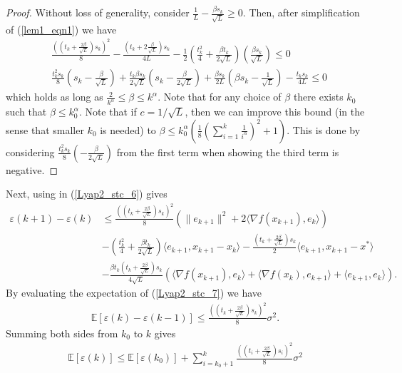 \documentclass{article}
\theoremstyle{plain}
\theoremstyle{definition}
\theoremstyle{remark}
\begin{document}
        \begin{proof}\label{lem1_proof}
            Without loss of generality, consider $\frac{1}{L}-\frac{\beta s_k}{\sqrt{L}}\geq 0$. Then, after simplification of (\ref{lem1_eqn1}) we have
            \begin{align}\label{lem1_eqn2}
                &\frac{((t_k+\frac{2\beta}{\sqrt{L}})s_k)^2}{8}- \frac{(t_k+2\frac{\beta}{\sqrt{L}})s_k}{4L}-\frac{1}{2}\left(\frac{t_k^2}{4}+\frac{\beta t_k}{2\sqrt{L}} \right)(\frac{\beta s_k}{\sqrt{L}})\leq 0\nonumber\\
                & \frac{t_k^2s_k}{8}(s_k-\frac{\beta}{\sqrt{L}})+\frac{t_k \beta s_k}{2\sqrt{L}}(s_k-\frac{\beta}{2\sqrt{L}})+\frac{\beta s_k}{2 L}(\beta s_k-\frac{1}{\sqrt{L}})-\frac{t_k s_k}{4L}\leq 0
            \end{align}
            which holds as long as $\frac{2}{k^{\alpha}}\leq \beta \leq k^{\alpha}$. Note that for any choice of $\beta$ there exists $k_0$ such that $\beta\leq k_0^{\alpha}$. Note that if \(c=1/\sqrt{L}\), then we can improve this bound (in the sense that smaller \(k_0\) is needed) to $\beta\leq k_0^{\alpha}(\frac{1}{8}(\sum_{i=1}^k\frac{1}{i^{\alpha}})^2+1)$. This is done by considering  \(\frac{t_k^2s_k}{8}(-\frac{\beta}{2\sqrt{L}})\) from the first term when showing the third term is negative. 
        \end{proof}
Next, using  in (\ref{Lyap2_stc_6}) gives 
\begin{align}\label{Lyap2_stc_7}
    \varepsilon(k+1)-\varepsilon(k)&\leq \frac{((t_k+\frac{2\beta}{\sqrt{L}})s_k)^2}{8}(\|e_{k+1}\|^2+2\langle \nabla f(x_{k+1}) ,e_k \rangle)\nonumber\\
         & -(\frac{t_k^2}{4}+\frac{\beta t_k}{2\sqrt{L}})\langle e_{k+1},x_{k+1}-x_k\rangle-\frac{(t_k+\tfrac{2\beta}{\sqrt{L}})s_k}{2}\langle e_{k+1},x_{k+1}-x^*\rangle\nonumber\\
         &-\frac{\beta t_k(t_k+\frac{2\beta}{\sqrt{L}})s_k}{4\sqrt{L}}\left(\langle \nabla f(x_{k+1}),e_k \rangle+\langle \nabla f(x_{k}) , e_{k+1}\rangle+\langle e_{k+1},e_k\rangle\right).
\end{align}
    By evaluating the expectation of (\ref{Lyap2_stc_7}) we have
    \begin{align}\label{Lyap2_stc_8}
        \mathbb{E}\left[\varepsilon(k)-\varepsilon(k-1)\right]\leq \frac{((t_k+\frac{2\beta}{\sqrt{L}})s_k)^2}{8}\sigma^2.
    \end{align}
    Summing both sides from $k_0$ to $k$ gives
    \begin{align}\label{Lyap2_stc_9}
        \mathbb E[\varepsilon(k)]\leq \mathbb E[\varepsilon(k_0)]+\sum_{i=k_0+1}^{k}\frac{((t_i+\frac{2\beta}{\sqrt{L}})s_i)^2}{8}\sigma^2
    \end{align}
\end{document}
